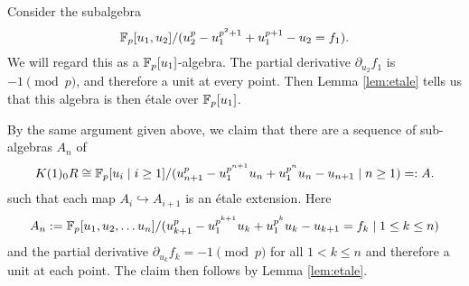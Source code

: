 \begin{ex}
	Consider the subalgebra
	\[
	\mathbb{F}_p[u_1,u_2]/(u_2^p-u_1^{p^2+1}+u_1^{p+1}-u_2=f_1).
	\]
	We will regard this as a $\mathbb{F}_p[u_1]$-algebra. The partial derivative $\partial_{u_2}f_1$ is $-1\pmod{p}$, and therefore a unit at every point. Then Lemma \ref{lem:etale} tells us that this algebra is then \'etale over $\mathbb{F}_p[u_1]$.
\end{ex} 

By the same argument given above, we claim that there are a sequence of sub-algebras $A_n$ of 
	\[
	K(1)_0 R\cong\mathbb{F}_p[u_i\mid i\geq 1]/(u_{n+1}^p-u_1^{p^{n+1}}u_n+u_1^{p^n}u_n-u_{n+1}\mid n\geq 1)=:A.
	\]
such that each map $A_i\hookrightarrow A_{i+1}$ is an \'etale extension. Here 
\[A_n:=\mathbb{F}_p[u_1,u_2,\ldots u_n]/(u_{k+1}^p-u_1^{p^{k+1}}u_k+u_1^{p^k}u_k-u_{k+1} =f_{k} \mid 1\le k\le n)\]
and the partial derivative $\partial_{u_k}f_{k}=-1\pmod{p}$ for all $1<k\le n$ and therefore a unit at each point. The claim then follows by Lemma \ref{lem:etale}.

